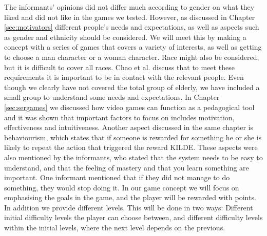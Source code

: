 The informants' opinions did not differ much according to gender on what they liked and did not like in the games we tested. However, as discussed in Chapter \ref{sec:motivators} different people's needs and expectations, as well as aspects such as gender and ethnicity should be considered. We will meet this by making a concept with a series of games that covers a variety of interests, as well as getting to choose a man character or a woman character. Race might also be considered, but it is difficult to cover all races. Chao et al. \cite{chao} discuss that to meet these requirements it is important to be in contact with the relevant people. Even though we clearly have not covered the total group of elderly, we have included a small group to understand some needs and expectations. In Chapter \ref{sec:sergames} we discussed how video games can function as a pedagogical tool and it was shown that important factors to focus on includes motivation, effectiveness and intuitiveness. Another aspect discussed in the same chapter is behaviourism, which states that if someone is rewarded for something he or she is likely to repeat the action that triggered the reward KILDE. These aspects were also mentioned by the informants, who stated that the system needs to be easy to understand, and that the feeling of mastery and that you learn something are important.  One informant mentioned that if they did not manage to do something, they would stop doing it. In our game concept we will focus on emphasising the goals in the game, and the player will be rewarded with points. In addition we provide different levels. This will be done in two ways: Different initial difficulty levels the player can choose between, and different difficulty levels within the initial levels, where the next level depends on the previous.  

